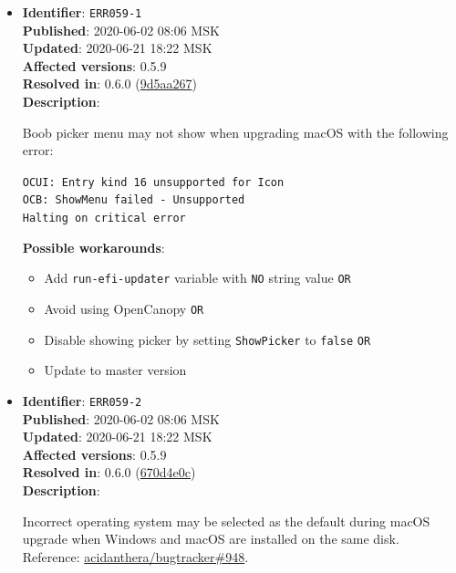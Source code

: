 \documentclass[]{article}
\providecommand{\tightlist}{%
  \setlength{\itemsep}{0pt}\setlength{\parskip}{0pt}}
\begin{document}
\begin{itemize}
\item
  \textbf{Identifier}: \texttt{ERR059-1} \\
  \textbf{Published}: 2020-06-02 08:06 MSK \\
  \textbf{Updated}: 2020-06-21 18:22 MSK \\
  \textbf{Affected versions}: 0.5.9 \\
  \textbf{Resolved in}: 0.6.0 (\href{https://github.com/acidanthera/OpenCorePkg/commit/9d5aa267a9133fd9390b62012c21428fc77681f2}{9d5aa267}) \\
  \textbf{Description}:

  Boob picker menu may not show when upgrading macOS with the following error:

\texttt{OCUI﻿: Ent﻿ry kind 16 unsupported for Icon﻿}\\
\texttt{OCB: ShowMenu failed - Unsupported﻿﻿}\\
\texttt{Halting on critical error﻿}

  \textbf{Possible workarounds}:
  \begin{itemize}
    \tightlist
    \item Add \texttt{run-efi-updater} variable with \texttt{NO} string value \texttt{OR}
    \item Avoid using OpenCanopy \texttt{OR}
    \item Disable showing picker by setting \texttt{ShowPicker} to \texttt{false} \texttt{OR}
    \item Update to master version
  \end{itemize}


\item
  \textbf{Identifier}: \texttt{ERR059-2} \\
  \textbf{Published}: 2020-06-02 08:06 MSK \\
  \textbf{Updated}: 2020-06-21 18:22 MSK \\
  \textbf{Affected versions}: 0.5.9 \\
  \textbf{Resolved in}: 0.6.0 (\href{https://github.com/acidanthera/OpenCorePkg/commit/670d4e0c4f8538268367d16fc3ddef9b2ed13d46}{670d4e0c}) \\
  \textbf{Description}:

  Incorrect operating system may be selected as the default during macOS upgrade when
  Windows and macOS are installed on the same disk. Reference:
  \href{https://github.com/acidanthera/bugtracker/issues/948}{acidanthera/bugtracker\#948}.


\end{itemize}
\end{document}
